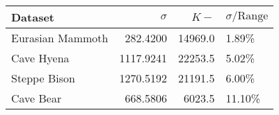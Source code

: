 
\begin{tabular}{lrrl}
\toprule
Dataset & $\sigma$ & $K-$ & $\sigma/\text{Range}$\\
\midrule
Eurasian Mammoth & 282.4200 & 14969.0 & 1.89\%\\
Cave Hyena & 1117.9241 & 22253.5 & 5.02\%\\
Steppe Bison & 1270.5192 & 21191.5 & 6.00\%\\
Cave Bear & 668.5806 & 6023.5 & 11.10\%\\
\bottomrule
\end{tabular}
